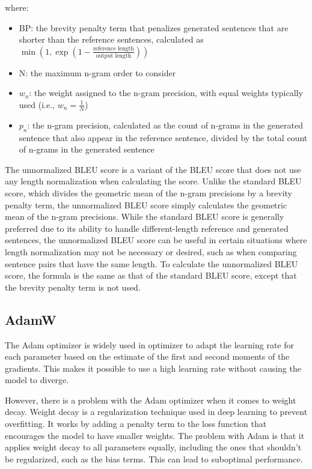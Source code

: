 \documentclass[12pt]{report}
\begin{document}
where:
\begin{itemize}
    \item BP: the brevity penalty term that penalizes generated sentences that are shorter than the reference sentences, calculated as $\min\left(1, \exp\left(1 - \frac{\text{reference length}}{\text{output length}}\right)\right)$
    \item N: the maximum n-gram order to consider
    \item $w_n$: the weight assigned to the n-gram precision, with equal weights typically used (i.e., $w_n = \frac{1}{N}$)
    \item $p_n$: the n-gram precision, calculated as the count of n-grams in the generated sentence that also appear in the reference sentence, divided by the total count of n-grams in the generated sentence
\end{itemize}

The unnormalized BLEU score is a variant of the BLEU score that does not use any length normalization when calculating the score. Unlike the standard BLEU score, which divides the geometric mean of the n-gram precisions by a brevity penalty term, the unnormalized BLEU score simply calculates the geometric mean of the n-gram precisions. While the standard BLEU score is generally preferred due to its ability to handle different-length reference and generated sentences, the unnormalized BLEU score can be useful in certain situations where length normalization may not be necessary or desired, such as when comparing sentence pairs that have the same length.
To calculate the unnormalized BLEU score, the formula is the same as that of the standard BLEU score, except that the brevity penalty term is not used.

\subsection{AdamW}
 The Adam optimizer is widely used in optimizer to adapt the learning rate for each parameter based on the estimate of the first and second moments of the gradients. This makes it possible to use a high learning rate without causing the model to diverge.

However, there is a problem with the Adam optimizer when it comes to weight decay. Weight decay is a regularization technique used in deep learning to prevent overfitting. It works by adding a penalty term to the loss function that encourages the model to have smaller weights. The problem with Adam is that it applies weight decay to all parameters equally, including the ones that shouldn't be regularized, such as the bias terms. This can lead to suboptimal performance.
\end{document}
